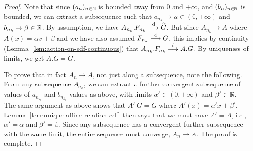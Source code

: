 \begin{proof}
  Note that since $(a_n)_{n \in \mathbb{N}}$ is bounded away from $0$ and $+\infty$,
  and $(b_n)_{n \in \mathbb{N}}$ is bounded, we can extract a subsequence such that
  $a_{n_k} \to \alpha \in (0,+\infty)$ and $b_{n_k} \to \beta \in \mathbb{R}$.
  By assumption, we have $A_{n_k} . F_{n_k} \overset{\mathrm{d}}{\longrightarrow} \widetilde{G}$.
  But since $A_{n_k} \to A$ where $A(x) = \alpha x + \beta$
  and we have also assumed $F_{n_k} \overset{\mathrm{d}}{\longrightarrow} G$, this implies by
  continuity (Lemma~\ref{lem:action-on-cdf-continuous}) that $A_{n_k} . F_{n_k} \overset{\mathrm{d}}{\longrightarrow} A . G$.
  By uniqueness of limits, we get $A . G = \widetilde{G}$.

  To prove that in fact $A_n \to A$, not just along a subsequence, note the
  following. From any subsequence $A_{n_k}$, we can extract a further
  convergent subsequence of values of $a_{n_{k_\ell}}$ and $b_{n_{k_\ell}}$
  values as above, with limits $\alpha' \in (0,+\infty)$
  and $\beta' \in \mathbb{R}$. The same argument as above shows that
  $A' . G = \widetilde{G}$ where $A'(x) = \alpha' x + \beta'$.
  Lemma~\ref{lem:unique-affine-relation-cdf} then says that we must have
  $A' = A$, i.e., $\alpha' = \alpha$ and $\beta' = \beta$. Since any
  subsequence has a convergent further subsequence with the same limit,
  the entire sequence must converge, $A_n \to A$.
  The proof is complete.
\end{proof}

